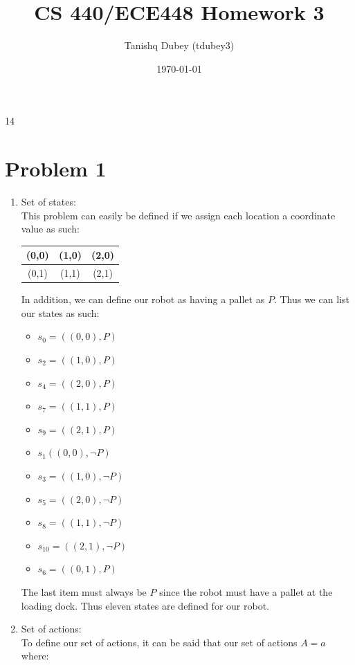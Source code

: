 14\documentclass[12pt]{article}%
\begin{document}
\title{CS 440/ECE448 Homework 3}
\author{Tanishq Dubey (tdubey3)}
\date{\today}
\maketitle
\section*{Problem 1}
    \begin{enumerate}
        \item Set of states: \\
        This problem can easily be defined if we assign each location a coordinate value as such: 
        \begin{center}
            \begin{tabular}{ c|c|c| } 
             \hline
             (0,0) & (1,0) & (2,0) \\ \hline
             (0,1) & (1,1) & (2,1) \\ \hline
            \end{tabular}
        \end{center}
         In addition, we can define our robot as having a pallet as $P$. Thus we can list our states as such:
            \begin{itemize}
                \item $s_0 = ((0,0), P)$
                \item $s_2 = ((1,0), P)$
                \item $s_4 = ((2,0), P)$
                \item $s_7 = ((1,1), P)$
                \item $s_9 = ((2,1), P)$
                \item $s_1 ((0,0), \neg P)$
                \item $s_3 = ((1,0), \neg P)$
                \item $s_5 = ((2,0), \neg P)$
                \item $s_8 = ((1,1), \neg P)$
                \item $s_10 = ((2,1), \neg P)$
                \item $s_6 = ((0,1), P)$
            \end{itemize}
        The last item must always be $P$ since the robot must have a pallet at the loading dock. Thus eleven states are defined for our robot.
        \item Set of actions: \\
        To define our set of actions, it can be said that our set of actions $A = {a}$ where:

\end{enumerate}
\end{document}

